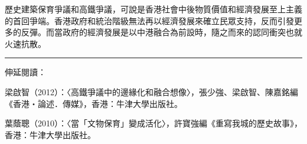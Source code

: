歷史建築保育爭議和高鐵爭議，可說是香港社會中後物質價值和經濟發展至上主義的首回爭端。香港政府和統治階級無法再以經濟發展來確立民眾支持，反而引發更多的反彈。而當政府的經濟發展是以中港融合為前設時，隨之而來的認同衝突也就火速抗散。

\rule[-10pt]{15cm}{0.05em}

伸延閱讀：

梁啟智（2012）：〈高鐵爭議中的邊緣化和融合想像〉，張少強、梁啟智、陳嘉銘編《香港‧論述．傳媒》，香港：牛津大學出版社。

葉蔭聰（2010）：〈當「文物保育」變成活化〉，許寶強編《重寫我城的歷史故事》，香港：牛津大學出版社。